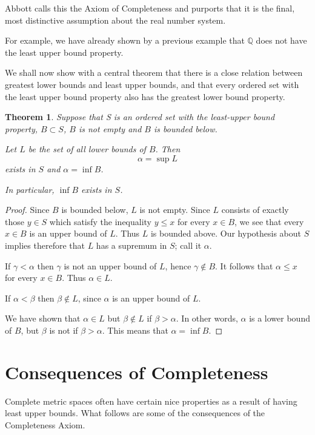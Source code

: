 \documentclass{tufte-book}
\newtheorem{theorem}{Theorem}[chapter]
\theoremstyle{definition}
\numberwithin{section}{chapter}
\begin{document}
Abbott calls this the Axiom of Completeness and purports that it is the final, most distinctive assumption about the real number system.

For example, we have already shown by a previous example that $\mathbb{Q}$ does not have the least upper bound property.


We shall now show with a central theorem that there is a close relation between greatest lower bounds and least upper bounds, and that every ordered set with the least upper bound property also has the greatest lower bound property.

\begin{theorem} 
Suppose that S is an ordered set with the least-upper bound property, $B \subset S$, $B$ is not empty and $B$ is bounded below.

Let $L$ be the set of all lower bounds of $B$.  Then
\[\alpha = \sup L\]
exists in $S$ and $\alpha = \inf B$.

In particular, $\inf B$ exists in $S$.
\end{theorem}

\begin{proof}
Since $B$ is bounded below, $L$ is not empty.  Since $L$ consists of exactly those $y \in S$ which satisfy the inequality $y \leq x$ for every $x \in B$, we see that every $x \in B$ is an upper bound of $L$.  Thus $L$ is bounded above.  Our hypothesis about $S$ implies therefore that $L$ has a supremum in $S$; call it $\alpha$.

If $\gamma < \alpha$ then $\gamma$ is not an upper bound of $L$, hence $\gamma \notin B$.  It follows that $\alpha \leq x$ for every $x \in B$.  Thus $\alpha \in L$.    

If $\alpha < \beta$ then $\beta \notin L$,  since $\alpha$ is an upper bound of $L$.

We have shown that $\alpha \in L$ but $\beta \notin L$ if $\beta> \alpha$.  In other words, $\alpha$ is a lower bound of $B$, but $\beta$ is not if $\beta>\alpha$.  This means that $\alpha = \inf B$.
\end{proof}

\section{Consequences of Completeness}

Complete metric spaces often have certain nice properties as a result of having least upper bounds.  What follows are some of the consequences of the Completeness Axiom.
\end{document}
